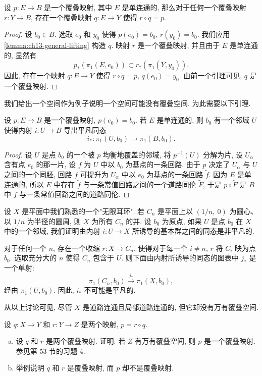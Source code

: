 \begin{theorem}[万有覆叠空间的万有性]
\label{theorem:ch13-universal-covers-all}
设 $p\colon E\to B$ 是一个覆叠映射, 其中 $E$ 是单连通的, 那么对于任何一个覆叠映射 $r\colon Y\to B$, 存在一个覆叠映射 $q\colon E\to Y$ 使得 $r\circ q=p$.
\end{theorem}

\begin{proof}
设 $b_{0}\in B$. 选取 $e_{0}$ 和 $y_{0}$ 使得 $p(e_{0})=b_{0}$, $r(y_{0})=b_{0}$. 我们应用 \cref{lemma:ch13-general-lifting} 构造 $q$. 映射 $r$ 是一个覆叠映射, 并且由于 $E$ 是单连通的, 显然有
\[
p_{*}(\pi_{1}(E,e_{0}))\subset r_{*}(\pi_{1}(Y,y_{0})).
\]
因此, 存在一个映射 $q\colon E\to Y$ 使得 $r\circ q=p$, $q(e_{0})=y_{0}$. 由前一个引理可见, $q$ 是一个覆叠映射.
\end{proof}

我们给出一个空间作为例子说明一个空间可能没有覆叠空间. 为此需要以下引理.

\begin{lemma}[单连通覆叠空间的局部平凡性]
\label{lemma:ch13-simply-connected-local-trivial}
设 $p\colon E\to B$ 是一个覆叠映射, $p(e_{0})=b_{0}$. 若 $E$ 是单连通的, 则 $b_{0}$ 有一个邻域 $U$ 使得内射 $i\colon U\to B$ 导出平凡同态
\[
i_{*}\colon\pi_{1}(U,b_{0})\longrightarrow\pi_{1}(B,b_{0}).
\]
\end{lemma}

\begin{proof}
设 $U$ 是点 $b_{0}$ 的一个被 $p$ 均衡地覆盖的邻域, 将 $p^{-1}(U)$ 分解为片, 设 $U_{\alpha}$ 含有点 $e_{0}$ 的那一片, 设 $f$ 为 $U$ 中以 $b_{0}$ 为基点的一条回路. 由于 $p$ 决定了 $U_{\alpha}$ 与 $U$ 之间的一个同胚, 回路 $f$ 可提升为 $U_{\alpha}$ 中以 $e_{0}$ 为基点的一条回路 $\widetilde{f}$. 因为 $E$ 是单连通的, 所以 $E$ 中存在 $\widetilde{f}$ 与一条常值回路之间的一个道路同伦 $\widetilde{F}$, 于是 $p\circ\widetilde{F}$ 是 $B$ 中 $f$ 与一条常值回路之间的道路同伦.
\end{proof}

\begin{example}[无限耳环没有万有覆叠空间]
\label{example:ch13-infinite-earring}
设 $X$ 是平面中我们熟悉的一个"无限耳环". 若 $C_{n}$ 是平面上以 $(1/n,\ 0)$ 为圆心、以 $1/n$ 为半径的圆周, 则 $X$ 为所有 $C_{n}$ 的并. 设 $b_{0}$ 为原点, 如果 $U$ 是点 $b_{0}$ 在 $X$ 中的一个邻域, 我们证明由内射 $i\colon U\to X$ 所诱导的基本群之间的同态是非平凡的.

对于任何一个 $n$, 存在一个收缩 $r\colon X\to C_{n}$, 使得对于每一个 $i\neq n$, $r$ 将 $C_{i}$ 映为点 $b_{0}$. 选取充分大的 $n$ 使得 $C_{n}$ 包含于 $U$. 则下面由内射所诱导的同态的图表中 $j_{*}$ 是一个单射:
\[
\pi_{1}(C_{n},b_{0})\xrightarrow{j_{*}}\pi_{1}(X,b_{0}),
\]
经由 $\pi_{1}(U,b_{0})$. 因此, $i_{*}$ 不可能是平凡的.

从以上讨论可见, 尽管 $X$ 是道路连通且局部道路连通的, 但它却没有万有覆叠空间.
\end{example}

\begin{exercise}
\label{exercise:ch13-sec80-01}
设 $q\colon X\to Y$ 和 $r\colon Y\to Z$ 是两个映射, $p=r\circ q$.
\begin{enumerate}[(a)]
\item 设 $q$ 和 $r$ 是两个覆叠映射. 证明: 若 $Z$ 有万有覆叠空间, 则 $p$ 是一个覆叠映射. 参见第 53 节的习题 4.
\item 举例说明 $q$ 和 $r$ 是覆叠映射, 而 $p$ 却不是覆叠映射.
\end{enumerate}
\end{exercise}
